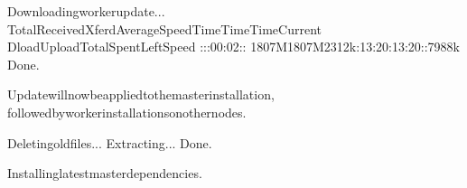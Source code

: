 \documentclass[a4paper,11pt,english]{sphinxmanual}
\begin{document}
\begin{sphinxVerbatim}[commandchars=\\\{\}]
Downloadingworkerupdate...
\PYGZpc{}Total\PYGZpc{}Received\PYGZpc{}XferdAverageSpeedTimeTimeTimeCurrent
DloadUploadTotalSpentLeftSpeed
\PYGZhy{}\PYGZhy{}:\PYGZhy{}\PYGZhy{}:\PYGZhy{}\PYGZhy{}:00:02\PYGZhy{}\PYGZhy{}:\PYGZhy{}\PYGZhy{}:\PYGZhy{}\PYGZhy{}
1807M1807M2312k:13:20:13:20\PYGZhy{}\PYGZhy{}:\PYGZhy{}\PYGZhy{}:\PYGZhy{}\PYGZhy{}7988k
Done.

Updatewillnowbeappliedtothemasterinstallation,
followedbyworkerinstallationsonothernodes.

Deletingoldfiles...
Extracting...
Done.

Installinglatestmasterdependencies.


\end{sphinxVerbatim}
\end{document}
